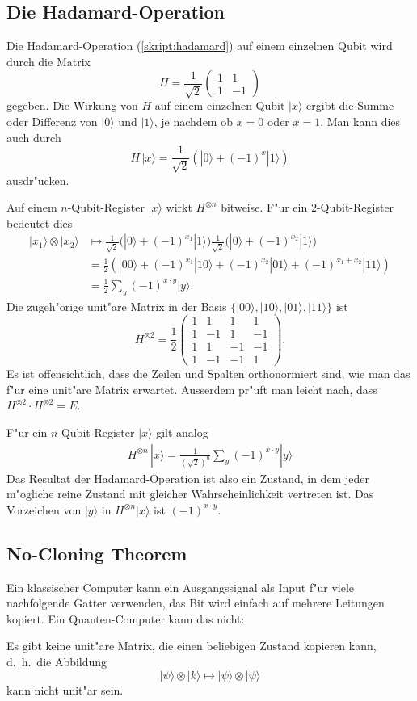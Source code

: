 \subsection{Die Hadamard-Operation}
Die Hadamard-Operation (\ref{skript:hadamard}) auf einem einzelnen
Qubit wird durch die Matrix
\[
H=
\frac{1}{\sqrt{2}}\begin{pmatrix}1&1\\1&-1\end{pmatrix}
\]
gegeben.
Die Wirkung von $H$ auf einem einzelnen Qubit $|x\rangle$ ergibt die Summe oder
Differenz von $|0\rangle$ und $|1\rangle$, je nachdem ob $x=0$ oder $x=1$.
Man kann dies auch durch
\[
H\,|x\rangle = \frac1{\sqrt{2}}(|0\rangle + (-1)^x|1\rangle)
\]
ausdr"ucken.

Auf einem $n$-Qubit-Register $|x\rangle$ wirkt $H^{\otimes n}$ bitweise.
F"ur ein $2$-Qubit-Register bedeutet dies
\begin{align*}
|x_1\rangle \otimes |x_2\rangle
&\mapsto
\frac1{\sqrt{2}} \biggl( |0\rangle + (-1)^{x_1}|1\rangle \biggr)
\frac1{\sqrt{2}} \biggl( |0\rangle + (-1)^{x_2}|1\rangle \biggr)
\\
&=
\frac12(
|00\rangle
+
(-1)^{x_1}
|10\rangle
+
(-1)^{x_2}
|01\rangle
+
(-1)^{x_1+x_2}
|11\rangle
)
\\
&=
\frac12
\sum_{y} (-1)^{x\cdot y} |y\rangle.
\end{align*}
Die zugeh"orige unit"are Matrix in der Basis
$\{|00\rangle,
|10\rangle,
|01\rangle,
|11\rangle\}$
ist
\[
H^{\otimes 2}
=
\frac12
\begin{pmatrix}
 1& 1& 1& 1\\
 1&-1& 1&-1\\
 1& 1&-1&-1\\
 1&-1&-1& 1
\end{pmatrix}.
\]
Es ist offensichtlich, dass die Zeilen und Spalten orthonormiert sind,
wie man das f"ur eine unit"are Matrix erwartet.
Ausserdem pr"uft man leicht nach, dass $H^{\otimes 2}\cdot H^{\otimes 2}=E$.

F"ur ein $n$-Qubit-Register $|x\rangle$ gilt analog
\begin{align*}
H^{\otimes n}\, |x\rangle
=
\frac1{(\sqrt{2})^n}
\sum_y (-1)^{x\cdot y}|y\rangle
\end{align*}
Das Resultat der Hadamard-Operation ist also ein Zustand, in dem
jeder m"ogliche reine Zustand mit gleicher Wahrscheinlichkeit vertreten ist.
Das Vorzeichen von $|y\rangle$ in $H^{\otimes n}|x\rangle$ ist
$(-1)^{x\cdot y}$.

\subsection{No-Cloning Theorem}
Ein klassischer Computer kann ein Ausgangssignal als Input f"ur viele
nachfolgende Gatter verwenden, das Bit wird einfach auf mehrere Leitungen
kopiert. 
Ein Quanten-Computer kann das nicht:
\begin{satz}
\label{skript:no-cloning-theorem}
Es gibt keine unit"are Matrix, die einen beliebigen Zustand kopieren
kann, d.~h.~die Abbildung
\[
|\psi\rangle\otimes|k\rangle\mapsto |\psi\rangle\otimes|\psi\rangle
\]
kann nicht unit"ar sein.
\end{satz}

